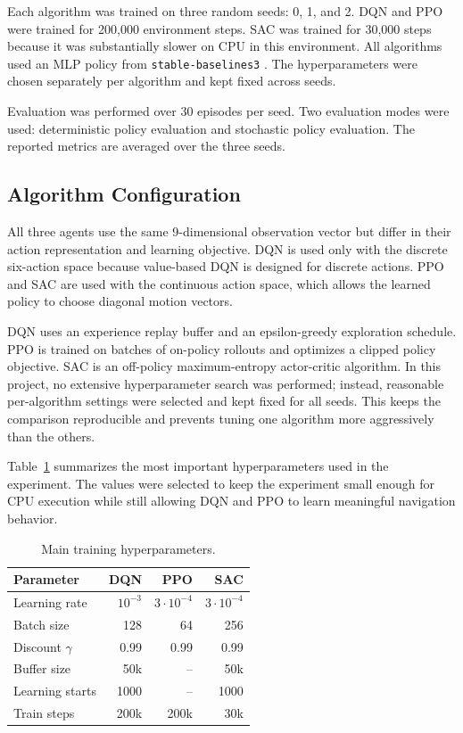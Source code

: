 \documentclass[conference]{IEEEtran}
\begin{document}
Each algorithm was trained on three random seeds: 0, 1, and 2. DQN and PPO
were trained for 200,000 environment steps. SAC was trained for 30,000 steps
because it was substantially slower on CPU in this environment. All algorithms
used an MLP policy from \texttt{stable-baselines3} \cite{stablebaselines3}.
The hyperparameters were chosen separately per algorithm and kept fixed across
seeds.

Evaluation was performed over 30 episodes per seed. Two evaluation modes were
used: deterministic policy evaluation and stochastic policy evaluation. The
reported metrics are averaged over the three seeds.

\subsection{Algorithm Configuration}

All three agents use the same 9-dimensional observation vector but differ in
their action representation and learning objective. DQN is used only with the
discrete six-action space because value-based DQN is designed for discrete
actions. PPO and SAC are used with the continuous action space, which allows
the learned policy to choose diagonal motion vectors.

DQN uses an experience replay buffer and an epsilon-greedy exploration schedule.
PPO is trained on batches of on-policy rollouts and optimizes a clipped policy
objective. SAC is an off-policy maximum-entropy actor-critic algorithm. In this
project, no extensive hyperparameter search was performed; instead, reasonable
per-algorithm settings were selected and kept fixed for all seeds. This keeps
the comparison reproducible and prevents tuning one algorithm more aggressively
than the others.

Table~\ref{tab:hyperparams} summarizes the most important hyperparameters used
in the experiment. The values were selected to keep the experiment small enough
for CPU execution while still allowing DQN and PPO to learn meaningful
navigation behavior.

\begin{table}[htbp]
\caption{Main training hyperparameters.}
\label{tab:hyperparams}
\centering
\begin{tabular}{lrrr}
\toprule
Parameter & DQN & PPO & SAC \\
\midrule
Learning rate & $10^{-3}$ & $3\cdot10^{-4}$ & $3\cdot10^{-4}$ \\
Batch size & 128 & 64 & 256 \\
Discount $\gamma$ & 0.99 & 0.99 & 0.99 \\
Buffer size & 50k & -- & 50k \\
Learning starts & 1000 & -- & 1000 \\
Train steps & 200k & 200k & 30k \\
\bottomrule
\end{tabular}
\end{table}
\end{document}
